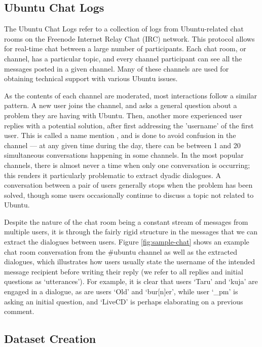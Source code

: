 \documentclass[11pt,a4paper]{article}
\begin{document}
\subsection{Ubuntu Chat Logs}


The Ubuntu Chat Logs refer to a collection of logs from Ubuntu-related chat rooms on the Freenode Internet Relay Chat (IRC) network. This protocol allows for real-time chat between a large number of participants. Each chat room, or channel, has a particular topic, and  every channel participant can see all the messages posted in a given channel. Many of these channels are used for obtaining technical support with various Ubuntu issues.

As the contents of each channel are moderated, most interactions follow a similar pattern. A new user joins the channel, and asks a general question about a problem they are having with Ubuntu. Then, another more experienced user replies with a potential solution, after first addressing the 'username' of the first user. This is called a name mention \cite{uthus2013extending}, and is done to avoid confusion in the channel --- at any given time during the day, there can be between 1 and 20 simultaneous conversations happening in some channels. In the most popular channels, there is almost never a  time when only one conversation is occurring; this renders it particularly problematic to extract dyadic dialogues. A conversation between a pair of users generally stops when the problem has been solved, though some users occasionally continue to discuss a topic not related to Ubuntu.


Despite the nature of the chat room being a constant stream of messages from multiple users, it is through the fairly rigid structure in the messages that we can extract the dialogues between users. Figure \ref{fig:sample-chat} shows an example chat room conversation from the \#ubuntu channel as well as the extracted dialogues, which illustrates how users usually state the username of the intended message recipient before writing their reply (we refer to all replies and initial questions as `utterances'). For example, it is clear that users `Taru' and `kuja' are engaged in a dialogue, as are users `Old' and `bur[n]er', while user `\_pm' is asking an initial question, and `LiveCD' is perhaps elaborating on a previous comment. 


\subsection{Dataset Creation}
\end{document}
